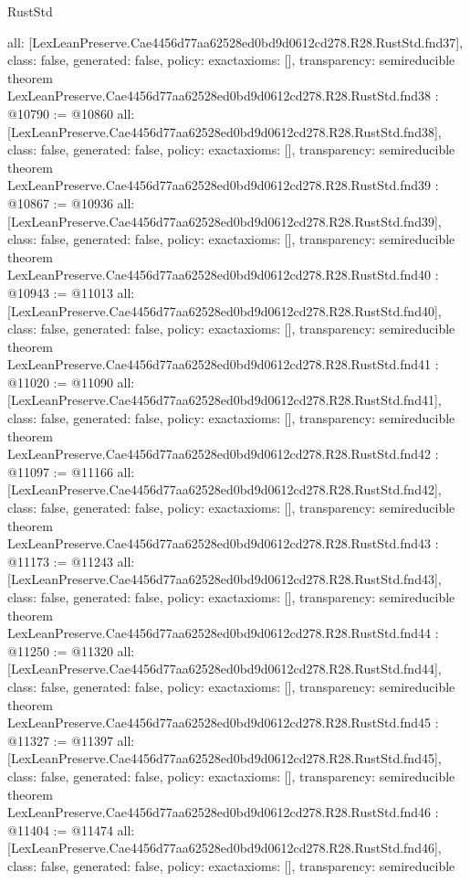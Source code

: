 \begin{lexlean}{RustStd}
\begin{coremodule}
{  all: [LexLeanPreserve.Cae4456d77aa62528ed0bd9d0612cd278.R28.RustStd.fnd37],
  class: false,
  generated: false,
  policy: exact{axioms: []},
  transparency: semireducible
}
theorem LexLeanPreserve.Cae4456d77aa62528ed0bd9d0612cd278.R28.RustStd.fnd38 : @10790 := @10860 {
  all: [LexLeanPreserve.Cae4456d77aa62528ed0bd9d0612cd278.R28.RustStd.fnd38],
  class: false,
  generated: false,
  policy: exact{axioms: []},
  transparency: semireducible
}
theorem LexLeanPreserve.Cae4456d77aa62528ed0bd9d0612cd278.R28.RustStd.fnd39 : @10867 := @10936 {
  all: [LexLeanPreserve.Cae4456d77aa62528ed0bd9d0612cd278.R28.RustStd.fnd39],
  class: false,
  generated: false,
  policy: exact{axioms: []},
  transparency: semireducible
}
theorem LexLeanPreserve.Cae4456d77aa62528ed0bd9d0612cd278.R28.RustStd.fnd40 : @10943 := @11013 {
  all: [LexLeanPreserve.Cae4456d77aa62528ed0bd9d0612cd278.R28.RustStd.fnd40],
  class: false,
  generated: false,
  policy: exact{axioms: []},
  transparency: semireducible
}
theorem LexLeanPreserve.Cae4456d77aa62528ed0bd9d0612cd278.R28.RustStd.fnd41 : @11020 := @11090 {
  all: [LexLeanPreserve.Cae4456d77aa62528ed0bd9d0612cd278.R28.RustStd.fnd41],
  class: false,
  generated: false,
  policy: exact{axioms: []},
  transparency: semireducible
}
theorem LexLeanPreserve.Cae4456d77aa62528ed0bd9d0612cd278.R28.RustStd.fnd42 : @11097 := @11166 {
  all: [LexLeanPreserve.Cae4456d77aa62528ed0bd9d0612cd278.R28.RustStd.fnd42],
  class: false,
  generated: false,
  policy: exact{axioms: []},
  transparency: semireducible
}
theorem LexLeanPreserve.Cae4456d77aa62528ed0bd9d0612cd278.R28.RustStd.fnd43 : @11173 := @11243 {
  all: [LexLeanPreserve.Cae4456d77aa62528ed0bd9d0612cd278.R28.RustStd.fnd43],
  class: false,
  generated: false,
  policy: exact{axioms: []},
  transparency: semireducible
}
theorem LexLeanPreserve.Cae4456d77aa62528ed0bd9d0612cd278.R28.RustStd.fnd44 : @11250 := @11320 {
  all: [LexLeanPreserve.Cae4456d77aa62528ed0bd9d0612cd278.R28.RustStd.fnd44],
  class: false,
  generated: false,
  policy: exact{axioms: []},
  transparency: semireducible
}
theorem LexLeanPreserve.Cae4456d77aa62528ed0bd9d0612cd278.R28.RustStd.fnd45 : @11327 := @11397 {
  all: [LexLeanPreserve.Cae4456d77aa62528ed0bd9d0612cd278.R28.RustStd.fnd45],
  class: false,
  generated: false,
  policy: exact{axioms: []},
  transparency: semireducible
}
theorem LexLeanPreserve.Cae4456d77aa62528ed0bd9d0612cd278.R28.RustStd.fnd46 : @11404 := @11474 {
  all: [LexLeanPreserve.Cae4456d77aa62528ed0bd9d0612cd278.R28.RustStd.fnd46],
  class: false,
  generated: false,
  policy: exact{axioms: []},
  transparency: semireducible
}
\end{coremodule}
\end{lexlean}
